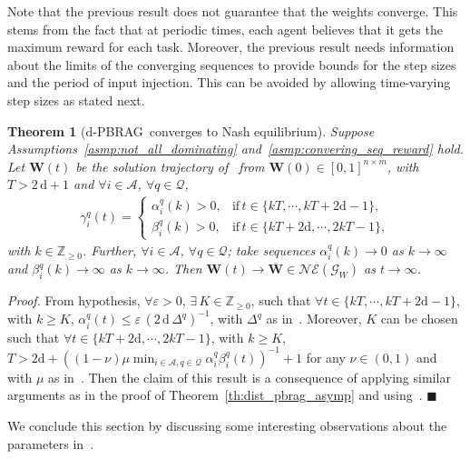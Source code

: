 \documentclass{IEEEtran}
\newcommand{\Mcal}[1]{\mathcal{#1}}
\newcommand{\Mc}[1]{\mathcal{#1}}
\newcommand{\bld}[1]{\mathbf{#1}}
\newtheorem{theorem}{Theorem}[section]
\newcommand{\integer}{\ensuremath{\mathbb{Z}}}
\newcommand{\squaresym}{\hbox{$\blacksquare$}}
\newcommand{\proofend}{\relax\ifmmode\else\unskip\hfill\fi\squaresym}
\renewenvironment{proof}{\textit{Proof.} }{\proofend}
\renewcommand{\bar}[1]{\overline{#1}}
\def \agt{\Mcal{A}}
\def \dg{\mathrm{d}}
\def \game{\mathscr{G}}
\def \integer{\mathbb{Z}}
\def \intpos{\integer_{\geq 0}}
\def \ne{\Mc{NE}}
\def \tsk{\Mc{Q}}
\def \W{\bld{W}}
\def \Wb{\bar{\W}}
\def \dynacr{PBRAG}
\begin{document}
Note that the previous result does not guarantee that the weights
converge. This stems from the fact that at periodic times, each agent
believes that it gets the maximum reward for each
task. %
Moreover, the previous result needs information about the limits of
the converging sequences to provide bounds for the step sizes and the
period of input injection. This can be avoided by allowing
time-varying step sizes as stated next.

\begin{theorem}[d-\dynacr\, converges to Nash equilibrium]
\label{th:dist_pbrag_converge}
Suppose Assumptions~\ref{asmp:not_all_dominating} and~\ref{asmp:convering_seq_reward} hold.
Let $\W(t)$ be the solution trajectory of~ from $\W(0) \in [0,1]^{n \times m}$, with $T > 2\,\dg + 1$ and $\forall i \in \agt$, $\forall q \in \tsk$,
\begin{align*}
	\gamma^q_i(t) = 
	\begin{cases}
		\alpha^q_i(k)>0, & \mathrm{if}\, t \in \{kT,\cdots,kT+2\dg-1\},\\
		\beta^q_i(k)>0, & \mathrm{if}\, t \in \{kT+2\dg,\cdots,2kT-1\},
	\end{cases}
\end{align*}
 with $k \in \intpos$. Further,
$\forall i \in \agt$, $\forall q \in \tsk$; take sequences
$\alpha^q_i(k) \to 0$ as $k \to \infty$ and $\beta^q_i(k) \to \infty$
as $k \to \infty$. Then $\W(t) \to \Wb \in \ne(\game_W)$ as $t \to \infty$.
\end{theorem}

\begin{proof}
  From hypothesis, $\forall \varepsilon > 0$,
  $\exists\, K \in \intpos$, such that
  $\forall t \in \{kT,\cdots,kT+2\dg-1\}$, with $k \geq K$,
  $\alpha^q_i(t) \leq \varepsilon \, (2\,\dg \, \Delta^q)^{-1}$, with
  $\Delta^q$ as in~. Moreover, $K$ can be
  chosen such that $\forall t \in \{kT+2\dg,\cdots,2kT-1\}$, with
  $k \geq K$,
  $T > 2\dg + ((1-\nu)\mu\min_{i \in \agt, q \in \tsk} \alpha^q_i
  \beta^q_i(t))^{-1} + 1$ for any $\nu \in (0,1)$ and with $\mu$ as
  in~. Then the claim of this result is a
  consequence of applying similar arguments as in the proof of
  Theorem~\ref{th:dist_pbrag_asymp} and using~.
\end{proof}

We conclude this section by discussing some interesting observations
about the parameters in~.
\end{document}
